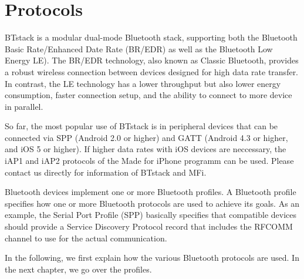 
\pagebreak

\section{Protocols}
\label{section:protocols_profiles}

BTstack is a modular dual-mode Bluetooth stack, supporting both the Bluetooth Basic Rate/Enhanced Date Rate (BR/EDR)  as well as the Bluetooth Low Energy LE). The BR/EDR technology, also known as Classic Bluetooth, provides a robust wireless connection between devices designed for high data rate transfer. In contrast, the LE technology has a lower throughput but also lower energy consumption, faster connection setup, and the ability to connect to more device in parallel.

So far, the most popular use of BTstack is in peripheral devices that can be connected via SPP (Android 2.0 or higher) and GATT (Android 4.3 or higher, and iOS 5 or higher). If higher data rates with iOS devices are neccessary, the iAP1 and iAP2 protocols of the Made for iPhone programm can be used. Please contact us directly for information of BTstack and MFi.

Bluetooth devices implement one or more Bluetooth profiles. A Bluetooth profile specifies how one or more Bluetooth protocols are used to achieve its goals. As an example, the Serial Port Profile (SPP) basically specifies that compatible devices should provide a Service Discovery Protocol record that includes the RFCOMM channel to use for the actual communication.

In the following, we first explain how the various Bluetooth protocols are used. In the next chapter, we go over the profiles.																			

